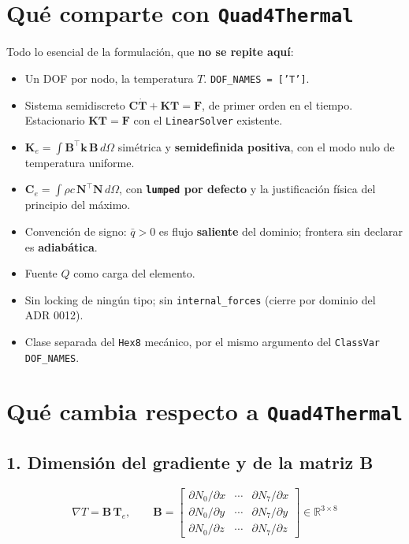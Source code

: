 \documentclass[11pt,letterpaper,oneside]{report}
\begin{document}
\section{Qué comparte con \texttt{Quad4Thermal}}

Todo lo esencial de la formulación, que \textbf{no se repite aquí}:

\begin{itemize}
  \item Un DOF por nodo, la temperatura $T$. \texttt{DOF\_NAMES = ['T']}.
  \item Sistema semidiscreto $\mathbf C\dot{\mathbf T} + \mathbf K\mathbf T = \mathbf F$, de primer orden en el tiempo. Estacionario $\mathbf K\mathbf T = \mathbf F$ con el \texttt{LinearSolver} existente.
  \item $\mathbf K_e = \int \mathbf B^\top\mathbf k\,\mathbf B\,d\Omega$ simétrica y \textbf{semidefinida positiva}, con el modo nulo de temperatura uniforme.
  \item $\mathbf C_e = \int \rho c\,\mathbf N^\top\mathbf N\,d\Omega$, con \textbf{\texttt{lumped} por defecto} y la justificación física del principio del máximo.
  \item Convención de signo: $\bar q > 0$ es flujo \textbf{saliente} del dominio; frontera sin declarar es \textbf{adiabática}.
  \item Fuente $Q$ como carga del elemento.
  \item Sin locking de ningún tipo; sin \texttt{internal\_forces} (cierre por dominio del ADR 0012).
  \item Clase separada del \texttt{Hex8} mecánico, por el mismo argumento del \texttt{ClassVar DOF\_NAMES}.
\end{itemize}


\section{Qué cambia respecto a \texttt{Quad4Thermal}}

\subsection{1. Dimensión del gradiente y de la matriz B}

\[
\nabla T = \mathbf B\,\mathbf T_e, \qquad \mathbf B = \begin{bmatrix} \partial N_0/\partial x & \cdots & \partial N_7/\partial x \\[2pt] \partial N_0/\partial y & \cdots & \partial N_7/\partial y \\[2pt] \partial N_0/\partial z & \cdots & \partial N_7/\partial z \end{bmatrix} \in \mathbb R^{3\times 8}
\]
\end{document}
